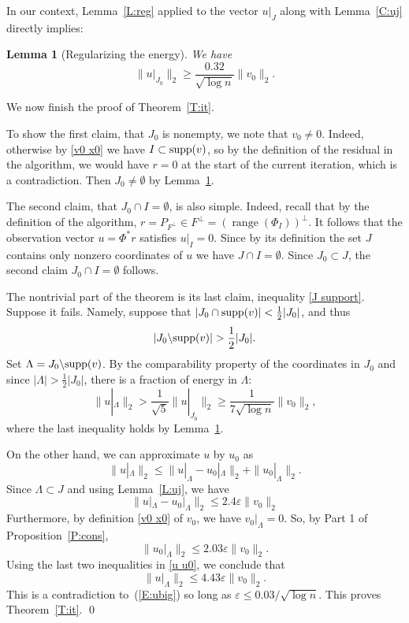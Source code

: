 \documentclass[12pt]{amsart}
\theoremstyle{plain}
\newtheorem{lemma}[theorem]{Lemma}
\theoremstyle{definition}
\theoremstyle{remark}
\numberwithin{equation}{section}
\begin{document}
In our context, Lemma~\ref{L:reg} applied to the vector $u|_J$ along with 
Lemma~\ref{C:uj} directly implies:

\begin{lemma}[Regularizing the energy]\label{C:uj0} 
  We have
  $$
  \|u|_{J_0}\|_2 \ge \frac{0.32}{\sqrt{\log n}}\|v_0\|_2.
  $$
\end{lemma}

\medskip

We now finish the proof of Theorem~\ref{T:it}. 

To show the first claim, that $J_0$ is nonempty, we note that 
$v_0 \ne 0$. Indeed, otherwise by \eqref{v0 x0} we have $I \subset {{\rm supp}}(v)$, 
so by the definition of the residual in the algorithm, we would have $r = 0$
at the start of the current iteration, which is a contradiction. 
Then $J_0 \ne \emptyset$ by Lemma~\ref{C:uj0}.

The second claim, that $J_0 \cap I = \emptyset$, is also simple. 
Indeed, recall that by the definition of the algorithm, 
$r = P_{F^\perp} \in F^\perp = (\operatorname*{range}(\Phi_I))^\perp$. 
It follows that the observation vector $u = \Phi^* r$  
satisfies $u|_I = 0$. Since by its definition the set $J$ contains only 
nonzero coordinates of $u$ we have $J \cap I = \emptyset$.
Since $J_0 \subset J$, the second claim $J_0 \cap I = \emptyset$ follows. 

The nontrivial part of the theorem is its last claim, inequality \eqref{J support}.
Suppose it fails. Namely, suppose that 
$|J_0 \cap {{\rm supp}}(v)| < \frac{1}{2}|J_0|$, 
and thus
$$
|J_0 \backslash {{\rm supp}}(v)| > \frac{1}{2}|J_0|.
$$
Set $\Lambda = J_0\backslash{{\rm supp}}(v)$. 
By the comparability property of the coordinates in $J_0$ 
and since $|\Lambda| > \frac{1}{2}|J_0|$, there is a fraction of energy 
in $\Lambda$:
\begin{equation}\label{E:ubig} 
  \|u|_{\Lambda}\|_2 > \frac{1}{\sqrt{5}}\|u|_{J_0}\|_2 
  \ge \frac{1}{7\sqrt{\log n}}\|v_0\|_2, 
\end{equation}
where the last inequality holds by Lemma~\ref{C:uj0}.

On the other hand, we can approximate $u$ by $u_0$ as
\begin{equation}                \label{u u0}
  \|u|_{\Lambda}\|_2 
  \le \|u|_{\Lambda} - u_0|_{\Lambda}\|_2 + \|u_0|_{\Lambda}\|_2.
\end{equation}
Since ${\Lambda} \subset J$ and using Lemma~\ref{L:uj}, we have
$$
\|u|_{\Lambda} - u_0|_{\Lambda}\|_2 \le 2.4{\varepsilon}\|v_0\|_2
$$
Furthermore, by definition \eqref{v0 x0} of $v_0$, we have $v_0|_\Lambda = 0$. 
So, by Part 1 of Proposition~\ref{P:cons}, 
$$
\|u_0|_{\Lambda}\|_2 \le 2.03 {\varepsilon} \|v_0\|_2.
$$
Using the last two inequalities in \eqref{u u0}, we conclude that 
$$
\|u|_{\Lambda}\|_2 \le 4.43 {\varepsilon} \|v_0\|_2.
$$
This is a contradiction to~(\ref{E:ubig}) 
so long as ${\varepsilon} \leq
 0.03 /  \sqrt{\log n}$. 
This proves Theorem~\ref{T:it}.
\qed
    
\end{document}
